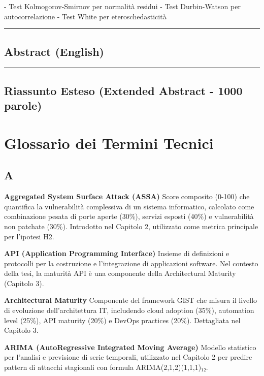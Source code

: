 \documentclass[12pt,a4paper,oneside]{book}
\numberwithin{figure}{chapter} %
\numberwithin{table}{chapter}  %
\begin{document}
- Test Kolmogorov-Smirnov per normalità residui
- Test Durbin-Watson per autocorrelazione
- Test White per eteroschedasticità



\begin{center}\rule{0.5\linewidth}{0.5pt}\end{center}

\section{Abstract (English)}\label{abstract-english}

\begin{center}\rule{0.5\linewidth}{0.5pt}\end{center}

\section{Riassunto Esteso (Extended Abstract - 1000
parole)}\label{riassunto-esteso-extended-abstract---1000-parole}

\chapter{Glossario dei Termini
Tecnici}\label{glossario-dei-termini-tecnici}

\section{A}\label{a}

\textbf{Aggregated System Surface Attack (ASSA)} Score composito (0-100)
che quantifica la vulnerabilità complessiva di un sistema informatico,
calcolato come combinazione pesata di porte aperte (30\%), servizi
esposti (40\%) e vulnerabilità non patchate (30\%). Introdotto nel
Capitolo 2, utilizzato come metrica principale per l'ipotesi H2.

\textbf{API (Application Programming Interface)} Insieme di definizioni
e protocolli per la costruzione e l'integrazione di applicazioni
software. Nel contesto della tesi, la maturità API è una componente
della Architectural Maturity (Capitolo 3).

\textbf{Architectural Maturity} Componente del framework GIST che misura
il livello di evoluzione dell'architettura IT, includendo cloud adoption
(35\%), automation level (25\%), API maturity (20\%) e DevOps practices
(20\%). Dettagliata nel Capitolo 3.

\textbf{ARIMA (AutoRegressive Integrated Moving Average)} Modello
statistico per l'analisi e previsione di serie temporali, utilizzato nel
Capitolo 2 per predire pattern di attacchi stagionali con formula
ARIMA(2,1,2)(1,1,1)₁₂.
\end{document}
